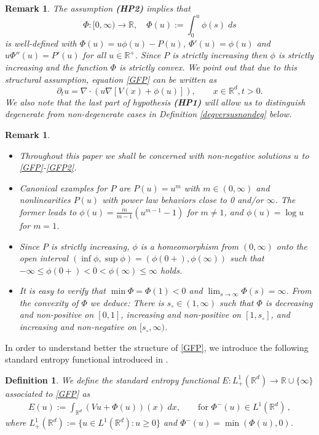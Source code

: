 \documentclass[reqno]{amsart}
\newtheorem{remark}[lemma]{Remark}
\newtheorem{definition}[lemma]{Definition}
\newcommand{\R}{\mathbb{R}}
\begin{document}
\begin{remark}%
The assumption {\bf (HP2)} implies that
\[
\Phi : [0,\infty) \to \R,\quad \Phi(u):= \int_0^u \phi(s)\;ds 
\]
is well-defined with $\Phi(u)=u\phi(u)-P(u)$, $\Phi'(u)=\phi(u)$ and $u\Phi''(u)=P'(u)$ for all $u\in\R^+$. Since $P$ is strictly increasing then $\phi$ is strictly increasing and the function $\Phi$ is strictly convex. We point out that due to this structural assumption, equation \eqref{GFP} can be written as
\begin{equation*}
    \partial_t u=\nabla\cdot\left(u \nabla \left[V(x) +  \phi(u)\right]\right),\qquad x\in \R^d, t>0.
\end{equation*}
We also note that the last part of hypothesis {\bf (HP1)} will allow us to distinguish degenerate from non-degenerate cases in Definition \ref{degversusnondeg} below.
\end{remark}

\begin{remark}\label{data3}\
\begin{itemize}
\item [(a)] Throughout this paper we shall be concerned with non-negative
solutions $u$ to \eqref{GFP}-\eqref{GFP2}.
\item [(b)] Canonical examples for $P$ are $P(u)=u^m$ with $m\in(0,\infty)$ and nonlinearities $P(u)$ with power law behaviors close to 0 and/or $\infty$. 
The former leads to $\phi(u)=\frac{m}{m-1}(u^{m-1}-1)$ for $m\ne1$, and $\phi(u)=\log u$ for $m=1$.
\item [(c)] Since $P$ is strictly increasing, $\phi$ is a homeomorphism from
$(0,\infty)$ onto the open interval $(\inf \phi,\sup \phi)=(\phi(0+),\phi(\infty))$ such that $-\infty\le \phi(0+)< 0 < \phi(\infty) \le\infty$ holds.
\item [(d)] It is easy to verify that $\min\Phi = \Phi(1) < 0$ and $\lim_{s\to\infty} 
\Phi(s)=\infty$. From the convexity of $\Phi$ we deduce: There is $s_\circ\in 
(1,\infty)$ such that $\Phi$ is decreasing 
and non-positive on $[0,1]$, increasing and non-positive on $[1,s_\circ]$, 
and increasing and non-negative on $[s_\circ,\infty)$.
\end{itemize}
\end{remark}

In order to understand better the structure of \eqref{GFP}, we introduce the following standard entropy functional introduced in \cite{otto,CJMTU}.

\begin{definition}\label{standentropy}
We define the standard entropy functional $E : L^1_+(\R^d) \to  \R\cup\{\infty\}$ associated to \eqref{GFP} as 
\begin{align*}
E(u) := \int_{\R^d} (Vu + \Phi(u))(x)\;dx , \qquad \mbox{for } \Phi^-(u)\in L^1(\R^d)\,, 
\end{align*}
where $L^1_+(\R^d):=\{u\in L^1(\R^d): u\ge 0\}$ and $\Phi^-(u)=\min (\Phi(u),0)$. 
\end{definition}
\end{document}
